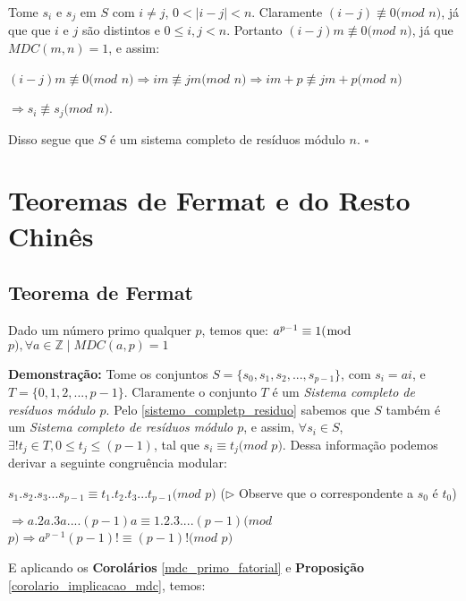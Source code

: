 Tome $s_i$ e $s_j$ em $S$ com $i\neq j$, $0 < |i-j| < n$. Claramente $(i-j)\not\equiv 0(mod$ $n)$, já que que $i$ e $j$ são distintos e $0 \leq i,j < n$.
Portanto $(i-j)m\not\equiv 0(mod$ $n)$, já que $MDC(m,n)=1$, e assim:

$(i-j)m\not\equiv 0(mod$ $n) \Rightarrow im \not\equiv jm(mod$ $n) \Rightarrow im+p \not\equiv jm+p(mod$ $n)$

$\Rightarrow s_i \not\equiv s_j(mod$ $n)$.

Disso segue que $S$ é um sistema completo de resíduos módulo $n$. $\square$



\section{Teoremas de Fermat e do Resto Chinês}

\subsection{Teorema de Fermat}

\begin{theorem}\label{teorema_fermat}
Dado um número primo qualquer $p$, temos que: 
$a^{p-1} \equiv 1 (\bmod$ $p), \forall a \in \mathbb{Z} \mid MDC(a, p) = 1$
\end{theorem}
\textbf{Demonstração:}
Tome os conjuntos $S = \{s_0, s_1, s_2, ..., s_{p-1}\}$, com $s_i = ai$, e $T = \{0, 1, 2,..., p-1\}$. 
Claramente o conjunto $T$ é um \textit{Sistema completo de resíduos módulo $p$}.
Pelo \autoref{sistemo_completp_residuo} sabemos que $S$ também é um \textit{Sistema completo de resíduos módulo $p$},
e assim, $\forall s_i\in S$, $\exists! t_j\in T, 0\leq t_j\leq(p-1)$, tal que $s_i\equiv t_j(mod$ $p)$. Dessa informação podemos derivar a seguinte congruência modular:

$s_1.s_2.s_3...s_{p-1} \equiv t_1.t_2.t_3...t_{p-1} (mod$ $p)$ ($\triangleright$ Observe que o correspondente a $s_0$ é $t_0$)

$\Rightarrow a.2a.3a....(p-1)a \equiv 1.2.3....(p-1) (mod$ $p) \Rightarrow a^{p-1}(p-1)! \equiv (p-1)! (mod$ $p)$

E aplicando os \textbf{Corolários} \autoref{mdc_primo_fatorial} e \textbf{Proposição} \autoref{corolario_implicacao_mdc}, temos:

